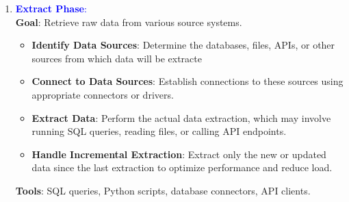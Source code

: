 \documentclass[letterpaper, 10.5pt,landscape]{article}
\begin{document}
\begin{multicols*}{3}
\begin{enumerate}[leftmargin=0.37cm]
    \item \textcolor{blue}{\textbf{Extract Phase}:}  \\
    \textbf{Goal}: Retrieve raw data from various source systems.
    \vspace{-2pt}
    \begin{itemize}[leftmargin=0.35cm]
        \vspace{-3pt}
        \item \textbf{Identify Data Sources}: Determine the databases, files, APIs, or other sources from which data will be extracte
        \vspace{-3pt}
        \item \textbf{Connect to Data Sources}: Establish connections to these sources using appropriate connectors or drivers.
        \vspace{-3pt}
        \item \textbf{Extract Data}: Perform the actual data extraction, which may involve running SQL queries, reading files, or calling API endpoints.
        \vspace{-3pt}
        \item \textbf{Handle Incremental Extraction}: Extract only the new or updated data since the last extraction to optimize performance and reduce load.
    \end{itemize}
    \vspace{-3pt}
    \textbf{Tools}: SQL queries, Python scripts, database connectors, API clients.



\end{enumerate}
\end{multicols*}
\end{document}
